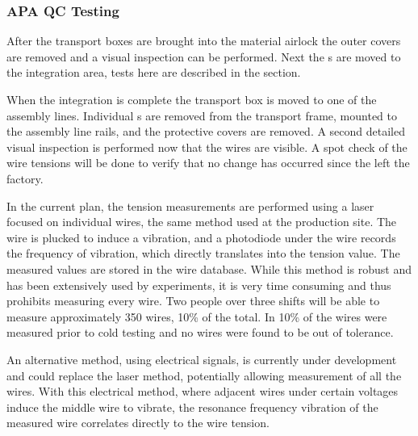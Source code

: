 \subsubsection{APA QC Testing}

After the  transport boxes are brought into the material airlock the outer covers are removed and a visual inspection can be performed. Next the s are moved to the  integration area, tests here are described in the   section. 

When the  integration is complete the  transport box is moved to one of the  assembly lines. Individual s are removed from the transport frame, mounted to the assembly line rails, and the protective covers are removed. A second detailed visual inspection is performed now that the wires are visible. A spot check of the wire tensions will be done to verify that no change has occurred since the  left the factory.

 
In the current plan, the tension measurements are performed using a laser focused on individual wires, the same method used at the production site. 
The wire is plucked to induce a vibration, and a photodiode under the wire records the frequency of vibration, which directly translates into the tension value. 
The measured values are stored in the wire  database. 
While this method is robust and has been extensively used by  experiments, it is very time consuming and thus prohibits measuring every wire. 
Two people over three shifts will be able to measure approximately 350 wires, 10\% of the total. In  10\% of the wires were measured prior to cold testing and no wires were found to be out of tolerance.

An alternative method, using electrical signals, is currently under development and could replace the laser method, potentially allowing measurement of all the wires. 
With this electrical method, where adjacent wires under certain voltages induce the middle wire to vibrate, the resonance frequency vibration of the measured wire correlates directly
to the wire tension. 

